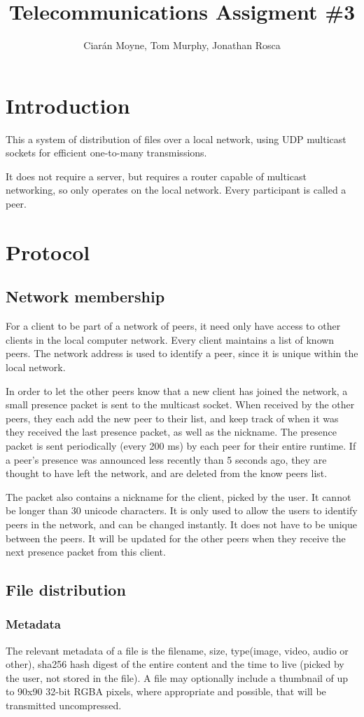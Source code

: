 \documentclass[a4paper, 12pt]{report}
\title{Telecommunications Assigment \#3}
\author{Ciar\'{a}n Moyne, Tom Murphy, Jonathan Rosca}
\begin{document}
\maketitle
\section{Introduction}
This a system of distribution of files over a local network, using UDP multicast sockets for efficient one-to-many transmissions. 

It does not require a server, but requires a router capable of multicast networking, so only operates on the local network. Every participant is called a peer.

\section{Protocol}
\subsection{Network membership}
For a client to be part of a network of peers, it need only have access to other clients in the local computer network. Every client maintains a list of known peers. The network address is used to identify a peer, since it is unique within the local network.

In order to let the other peers know that a new client has joined the network, a small presence packet is sent to the multicast socket. When received by the other peers, they each add the new peer to their list, and keep track of when it was they received the last presence packet, as well as the nickname. The presence packet is sent periodically (every 200 ms) by each peer for their entire runtime. If a peer's presence was announced less recently than 5 seconds ago, they are thought to have left the network, and are deleted from the know peers list.

The packet also contains a nickname for the client, picked by the user. It cannot be longer than 30 unicode characters. It is only used to allow the users to identify peers in the network, and can be changed instantly. It does not have to be unique between the peers. It will be updated for the other peers when they receive the next presence packet from this client.

\subsection{File distribution}
\subsubsection{Metadata}
The relevant metadata of a file is the filename, size, type(image, video, audio or other), sha256 hash digest of the entire content and the time to live (picked by the user, not stored in the file). A file may optionally include a thumbnail of up to 90x90 32-bit RGBA pixels, where appropriate and possible, that will be transmitted uncompressed.
\end{document}
